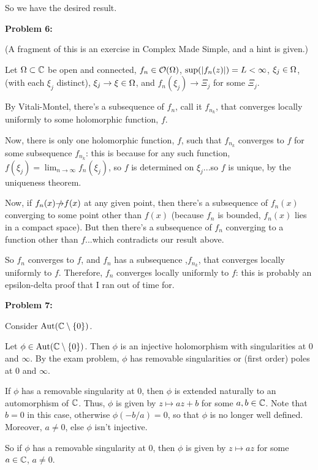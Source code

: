 \documentclass[a4paper,12pt]{article}
\begin{document}
So we have the desired result. 

\shunt

{\bf Problem 6:}

(A fragment of this is an exercise in Complex Made Simple, and a hint is given.)

Let $\Omega \subset \mathbb{C}$ be open and connected, $f_n \in \mathcal{O}(\Omega)$, $\sup(\left\lvert f_n(z) \right\rvert) = L < \infty$, $\xi_j \in \Omega$, (with each $\xi_j$ distinct), $\xi_j \to \xi \in \Omega$, and $f_n(\xi_j) \to \Xi_j$ for some $\Xi_j$.

By Vitali-Montel, there's a subsequence of $f_n$, call it $f_{n_k}$, that converges locally uniformly to some holomorphic function, $f$.

Now, there is only one holomorphic function, $f$, such that $f_{n_k}$ converges to $f$ for some subsequence $f_{n_k}$: this is because for any such function, $f(\xi_j) = \lim_{n \to \infty} f_n(\xi_j)$, so $f$ is determined on $\xi_j$...so $f$ is unique, by the uniqueness theorem.

Now, if $f_n(x) \slashed{\to} f(x)$ at any given point, then there's a subsequence of $f_n(x)$ converging to some point other than $f(x)$ (because $f_n$ is bounded, $f_n(x)$ lies in a compact space). But then there's a subsequence of $f_n$ converging to a function other than $f$...which contradicts our result above.

So $f_n$ converges to $f$, and $f_n$ has a subsequence ,$f_{n_k}$, that converges locally uniformly to $f$. Therefore, $f_n$ converges locally uniformly to $f$: this is probably an epsilon-delta proof that I ran out of time for. 

\shunt

{\bf Problem 7:}

Consider $\text{Aut}(\mathbb{C} \setminus \{0\})$.

Let $\phi \in \text{Aut}(\mathbb{C} \setminus \{0\})$. Then $\phi$ is an injective holomorphism with singularities at $0$ and $\infty$. By the exam problem, $\phi$ has removable singularities or (first order) poles at $0$ and $\infty$.

If $\phi$ has a removable singularity at $0$, then $\phi$ is extended naturally to an automorphism of $\mathbb{C}$. Thus, $\phi$ is given by $z \mapsto az+b$ for some $a,b \in \mathbb{C}$. Note that $b=0$ in this case, otherwise $\phi(-b/a) = 0$, so that $\phi$ is no longer well defined. Moreover, $a \neq 0$, else $\phi$ isn't injective.

So if $\phi$ has a removable singularity at $0$, then $\phi$ is given by $z \mapsto az$ for some $a \in \mathbb{C}$, $a \neq 0$.
\end{document}
